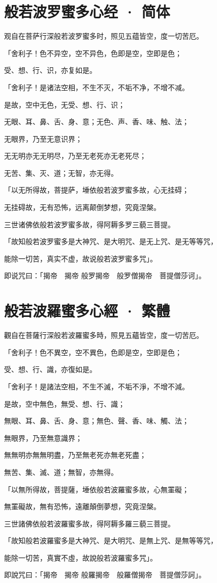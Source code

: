 \section{般若波罗蜜多心经 · 简体}
观自在菩萨行深般若波罗蜜多时，照见五蕴皆空，度一切苦厄。

「舍利子！色不异空，空不异色，色即是空，空即是色；

受、想、行、识，亦复如是。

「舍利子！是诸法空相，不生不灭，不垢不净，不增不减。

是故，空中无色，无受、想、行、识；

无眼、耳、鼻、舌、身、意；无色、声、香、味、触、法；

无眼界，乃至无意识界；

无无明亦无无明尽，乃至无老死亦无老死尽；

无苦、集、灭、道；无智，亦无得。

「以无所得故，菩提萨，埵依般若波罗蜜多故，心无挂碍；

无挂碍故，无有恐怖，远离颠倒梦想，究竟涅槃。

三世诸佛依般若波罗蜜多故，得阿耨多罗三藐三菩提。

「故知般若波罗蜜多是大神咒、是大明咒、是无上咒、是无等等咒，

能除一切苦，真实不虚，故说般若波罗蜜多咒」。

即说咒曰：「揭帝　揭帝 般罗揭帝　般罗僧揭帝　菩提僧莎诃」。

\section{般若波羅蜜多心經 · 繁體}
觀自在菩薩行深般若波羅蜜多時，照見五蘊皆空，度一切苦厄。

「舍利子！色不異空，空不異色，色即是空，空即是色；

受、想、行、識，亦復如是。

「舍利子！是諸法空相，不生不滅，不垢不淨，不增不減。

是故，空中無色，無受、想、行、識；

無眼、耳、鼻、舌、身、意；無色、聲、香、味、觸、法；

無眼界，乃至無意識界；

無無明亦無無明盡，乃至無老死亦無老死盡；

無苦、集、滅、道；無智，亦無得。

「以無所得故，菩提薩，埵依般若波羅蜜多故，心無罣礙；

無罣礙故，無有恐怖，遠離顛倒夢想，究竟涅槃。

三世諸佛依般若波羅蜜多故，得阿耨多羅三藐三菩提。

「故知般若波羅蜜多是大神咒、是大明咒、是無上咒、是無等等咒，

能除一切苦，真實不虛，故說般若波羅蜜多咒」。

即說咒曰：「揭帝　揭帝 般羅揭帝　般羅僧揭帝　菩提僧莎訶」。
